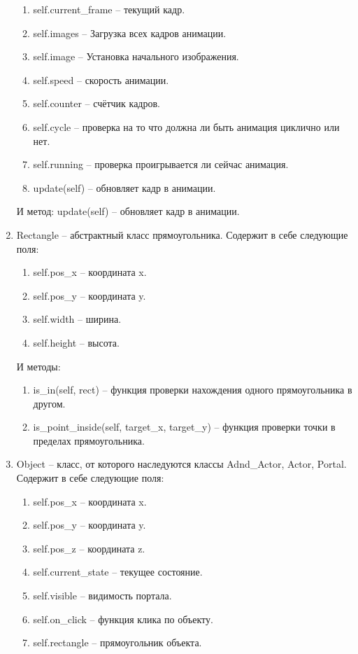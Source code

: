 \begin{enumerate}
\begin{enumerate}
			\item self.current\_frame -- текущий кадр.
			\item self.images  -- Загрузка всех кадров анимации.
			\item self.image -- Установка начального изображения.
			\item self.speed -- скорость анимации.
			\item self.counter -- счётчик кадров.
			\item self.cycle -- проверка на то что должна ли быть анимация циклично или нет.
			\item self.running -- проверка проигрывается ли сейчас анимация.
			\item update(self) -- обновляет кадр в анимации.
		\end{enumerate}
		И метод: update(self) -- обновляет кадр в анимации.
	\item Rectangle -- абстрактный класс прямоугольника. Содержит в себе следующие поля:
		\begin{enumerate}
			\item self.pos\_x -- координата x.
			\item self.pos\_y -- координата y.
			\item self.width -- ширина.
			\item self.height -- высота.
		\end{enumerate}
		И методы:
		\begin{enumerate}
			\item is\_in(self, rect) -- функция проверки нахождения одного прямоугольника в другом.
			\item is\_point\_inside(self, target\_x, target\_y) -- функция проверки точки в пределах прямоугольника.
		\end{enumerate}
	\item Object -- класс, от которого наследуются классы Adnd\_Actor, Actor, Portal. Содержит в себе следующие поля:
		\begin{enumerate}
			\item self.pos\_x -- координата x.
			\item self.pos\_y -- координата y.
			\item self.pos\_z -- координата z.
			\item self.current\_state -- текущее состояние.
			\item self.visible -- видимость портала.
			\item self.on\_click -- функция клика по объекту.
			\item self.rectangle -- прямоугольник объекта.

\end{enumerate}
\end{enumerate}
